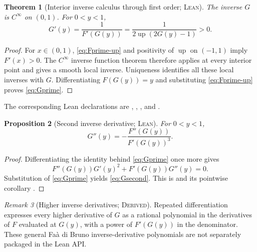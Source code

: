 \documentclass[11pt,oneside]{article}
\newtheorem{theorem}{Theorem}[section]
\newtheorem{proposition}[theorem]{Proposition}
\theoremstyle{definition}
\theoremstyle{remark}
\newtheorem{remark}[theorem]{Remark}
\newcommand{\Up}{\operatorname{up}}
\newcommand{\InvF}{G}
\newcommand{\Formalized}{\textsc{Lean}}
\newcommand{\Derived}{\textsc{Derived}}
\begin{document}
\begin{theorem}[Interior inverse calculus through first order; \Formalized]
\label{thm:inverse-calculus}
The inverse $\InvF$ is $C^\infty$ on $(0,1)$.  For $0<y<1$,
\begin{equation}
 \InvF'(y)
   =\frac1{F'(\InvF(y))}
     =\frac1{2\Up(2\InvF(y)-1)}>0.
 \label{eq:Gprime}
\end{equation}
\end{theorem}

\begin{proof}
For $x\in(0,1)$, \eqref{eq:Fprime-up} and positivity of $\Up$ on
$(-1,1)$ imply $F'(x)>0$.  The $C^\infty$ inverse function theorem
therefore applies at every interior point and gives a smooth local inverse.
Uniqueness identifies all these local inverses with $\InvF$.  Differentiating
$F(\InvF(y))=y$ and substituting \eqref{eq:Fprime-up} proves
\eqref{eq:Gprime}.
\end{proof}

The corresponding Lean declarations are ,
,
, and
.

\begin{proposition}[Second inverse derivative; \Formalized]
\label{prop:inverse-second-derivative}
For $0<y<1$,
\begin{equation}
 \InvF''(y)
   =-\frac{F''(\InvF(y))}
           {F'(\InvF(y))^3}.
 \label{eq:Gsecond}
\end{equation}
\end{proposition}

\begin{proof}
Differentiating the identity behind \eqref{eq:Gprime} once more gives
\[
 F''(\InvF(y))\InvF'(y)^2+
 F'(\InvF(y))\InvF''(y)=0.
\]
Substitution of \eqref{eq:Gprime} yields \eqref{eq:Gsecond}.  This is
 and its pointwise corollary
.
\end{proof}

\begin{remark}[Higher inverse derivatives; \Derived]
Repeated differentiation expresses every higher derivative of $\InvF$ as a
rational polynomial in the derivatives of $F$ evaluated at $\InvF(y)$, with a
power of $F'(\InvF(y))$ in the denominator.  These general Fa\`a di Bruno
inverse-derivative polynomials are not separately packaged in the Lean API.
\end{remark}
\end{document}
